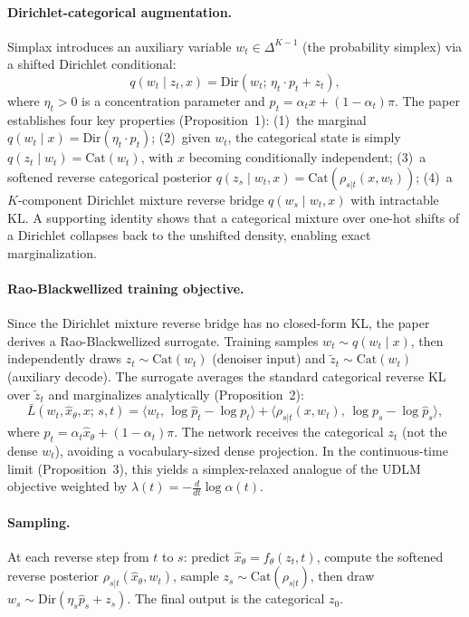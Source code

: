 \documentclass[11pt,a4paper]{article}
\begin{document}
\paragraph{Dirichlet-categorical augmentation.} Simplax introduces an auxiliary variable $w_t \in \Delta^{K-1}$ (the probability simplex) via a shifted Dirichlet conditional:
\begin{equation}
q(w_t \mid z_t, x) = \text{Dir}(w_t;\, \eta_t \cdot p_t + z_t),
\end{equation}
where $\eta_t > 0$ is a concentration parameter and $p_t = \alpha_t x + (1-\alpha_t)\pi$. The paper establishes four key properties (Proposition~1): (1)~the marginal $q(w_t \mid x) = \text{Dir}(\eta_t \cdot p_t)$; (2)~given $w_t$, the categorical state is simply $q(z_t \mid w_t) = \text{Cat}(w_t)$, with $x$ becoming conditionally independent; (3)~a softened reverse categorical posterior $q(z_s \mid w_t, x) = \text{Cat}(\rho_{s|t}(x, w_t))$; (4)~a $K$-component Dirichlet mixture reverse bridge $q(w_s \mid w_t, x)$ with intractable KL. A supporting identity shows that a categorical mixture over one-hot shifts of a Dirichlet collapses back to the unshifted density, enabling exact marginalization.

\paragraph{Rao-Blackwellized training objective.} Since the Dirichlet mixture reverse bridge has no closed-form KL, the paper derives a Rao-Blackwellized surrogate. Training samples $w_t \sim q(w_t \mid x)$, then independently draws $z_t \sim \text{Cat}(w_t)$ (denoiser input) and $\tilde{z}_t \sim \text{Cat}(w_t)$ (auxiliary decode). The surrogate averages the standard categorical reverse KL over $\tilde{z}_t$ and marginalizes analytically (Proposition~2):
\begin{equation}
\bar{L}(w_t, \hat{x}_\theta, x;\, s, t) = \langle w_t,\, \log \hat{p}_t - \log p_t \rangle + \langle \rho_{s|t}(x, w_t),\, \log p_s - \log \hat{p}_s \rangle,
\end{equation}
where $\hat{p}_t = \alpha_t \hat{x}_\theta + (1-\alpha_t)\pi$. The network receives the categorical $z_t$ (not the dense $w_t$), avoiding a vocabulary-sized dense projection. In the continuous-time limit (Proposition~3), this yields a simplex-relaxed analogue of the UDLM objective weighted by $\lambda(t) = -\frac{d}{dt}\log \alpha(t)$.

\paragraph{Sampling.} At each reverse step from $t$ to $s$: predict $\hat{x}_\theta = f_\theta(z_t, t)$, compute the softened reverse posterior $\rho_{s|t}(\hat{x}_\theta, w_t)$, sample $z_s \sim \text{Cat}(\rho_{s|t})$, then draw $w_s \sim \text{Dir}(\eta_s \hat{p}_s + z_s)$. The final output is the categorical $z_0$.
\end{document}
